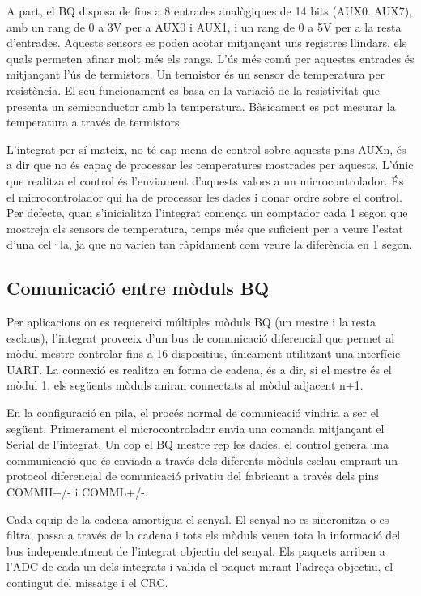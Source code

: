 A part, el BQ disposa de fins a 8 entrades analògiques de 14 bits (AUX0..AUX7), amb un rang de 0 a 3V per a AUX0 i AUX1, i un rang de 0 a 5V per a la resta d'entrades. Aquests sensors es poden acotar mitjançant uns registres llindars, els quals permeten afinar molt més els rangs. L'ús més comú per aquestes entrades és mitjançant l'ús de termistors. Un termistor és un sensor de temperatura per resistència. El seu funcionament es basa en la variació de la resistivitat que presenta un semiconductor amb la temperatura. Bàsicament es pot mesurar la temperatura a través de termistors.

L'integrat per sí mateix, no té cap mena de control sobre aquests pins AUXn, és a dir que no és capaç de processar les temperatures mostrades per aquests. L'únic que realitza el control és l'enviament d'aquests valors a un microcontrolador. És el microcontrolador qui ha de processar les dades i donar ordre sobre el control. Per defecte, quan s'inicialitza l'integrat comença un comptador cada 1 segon que mostreja els sensors de temperatura, temps més que suficient per a veure l'estat d'una cel·la, ja que no varien tan ràpidament com veure la diferència en 1 segon. 

\subsection{Comunicació entre mòduls BQ}

Per aplicacions on es requereixi múltiples mòduls BQ (un mestre i la resta esclaus), l'integrat proveeix d'un bus de comunicació diferencial que permet al mòdul mestre controlar fins a 16 dispositius, únicament utilitzant una interfície UART. La connexió es realitza en forma de cadena, és a dir, si el mestre és el mòdul 1, els següents mòduls aniran connectats al mòdul adjacent n+1. 

En la configuració en pila, el procés normal de comunicació vindria a ser el següent: 
Primerament el microcontrolador envia una comanda mitjançant el Serial de l'integrat. Un cop el BQ mestre rep les dades, el control genera una communicació que és enviada a través dels diferents mòduls esclau emprant un protocol diferencial de comunicació privatiu del fabricant a través dels pins COMMH+/- i COMML+/-.

Cada equip de la cadena amortigua el senyal. El senyal no es sincronitza o es filtra, passa a través de la cadena i tots els mòduls veuen tota la informació del bus independentment de l'integrat objectiu del senyal. Els paquets arriben a l'ADC de cada un dels integrats i valida el paquet mirant l'adreça objectiu, el contingut del missatge i el CRC. 


